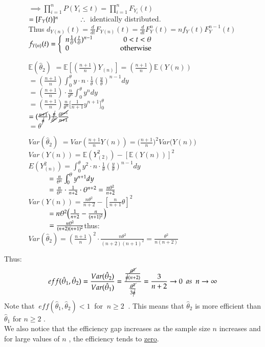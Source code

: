 \documentclass[14pt,twoside,a4paper,fleqn]{article}
\theoremstyle{plain}
\begin{document}
\begin{enumerate}
\begin{enumerate}
		$\implies \prod_{i=1}^n P(Y_i \leq t) = \prod_{i=1}^n F_{Y_i}(t)$\\
		$=[F_Y(t)]^n\hspace*{1cm}\therefore\ $ identically distributed.\\
		Thus $d_{Y(n)}(t) = \frac{d}{dt} F_{Y(n)}(t) = \frac{d}{dt} F_Y^n(t) = n f_Y(t)F_Y^{n-1}(t)$\\
		$f_{Y(n)}(t) = \left\{ \begin{array}{lr}
		n\frac{1}{\theta} (\frac{t}{\theta})^{n-1} &\hspace*{1cm} 0<t<\theta \\
		0 & \hspace*{1cm} \text{otherwise}
		\end{array}
		\right.$
	\item[$\mathbb{E}(\hat{\theta}_2)$]
		$= \mathbb{E}[(\frac{n+1}{n})Y_(n)] = (\frac{n+1}{n})\mathbb{E}(Y(n))$\\
		$=(\frac{n+1}{n})\int_0^\theta y \cdot n \cdot \frac{1}{\theta}(\frac{y}{\theta})^{n-1}dy$\\
		$=(\frac{n+1}{n})\cdot \frac{n}{\theta^n}\int_0^\theta y^n dy$\\
		$=(\frac{n+1}{n}) \frac{n}{\theta^n}\big[\frac{1}{n+1}y^{n+1}\big]_0^\theta$\\
		$=(\frac{\cancel{n+1}}{\cancel{n}}) \frac{\cancel{n}}{\cancel{\theta^n}} \frac{\theta^{\cancel{n+1}}}{\cancel{n+1}}$\\ 
		$=\theta$
	\item[$Var(\hat{\theta}_2)$]
		$=Var(\frac{n+1}{n} Y(n)) = \Big(\frac{n+1}{n})^2 Var(Y(n)\Big)$\\
		$Var(Y(n)) = \mathbb{E}(Y^2_{(2)}) - [\mathbb{E}(Y(n))]^2$\\
		$E(Y^2_{(n)}) = \int_0^\theta y^2 \cdot n \cdot \frac{1}{\theta}(\frac{y}{\theta})^{n-1} dy$\\
		$\hspace*{1cm} =\frac{n}{\theta^n}\int_0^\theta y^{n+1} dy$\\
		$\hspace*{1cm} =\frac{n}{\theta^n} \cdot \frac{1}{n+2} \cdot \theta^{n+2} = \frac{n \theta^2}{n+2}$\\
		$Var(Y(n)) = \frac{n\theta^2}{n+2} - [\frac{n}{n+1}\theta]^2$\\
		$\hspace*{1cm} = n\theta^2 \Big(\frac{1}{n+2} - \frac{n}{(n+1)^2}\Big)$\\
		$\hspace*{1cm} = \frac{n\theta^2}{(n+2)(n+1)^2}$\tab thus:\\
	$Var(\hat{\theta}_2) = (\frac{n+1}{n})^2 \cdot \frac{n\theta^2}{(n+2)(n+1)^2} = \frac{\theta^2}{n(n+2)}$
	\end{enumerate}
\end{enumerate}
Thus:
$$
	eff(\hat{\theta}_1 , \hat{\theta}_2) = \frac{Var(\hat{\theta}_2)}{Var(\hat{\theta}_1)} = \frac{\frac{\cancel{\theta^2}}{\cancel{n}(n+2)}}{\frac{\cancel{\theta^2}}{3\cancel{n}}} = \frac{3}{n+2} \to 0 \ \ as\ \ n\to\infty 
$$
Note that $\ eff(\hat{\theta}_1, \hat{\theta}_2) < 1\ $ for $\ n \geq 2\ $ . This means that $\hat{\theta}_2$ is more efficient than $\hat{\theta}_1$ for $n\geq 2$ .\\
We also notice that the efficiency gap increases as the sample size $n$ increases and for large values of $n$ , the efficiency tends to \underline{zero}.
\end{document}
